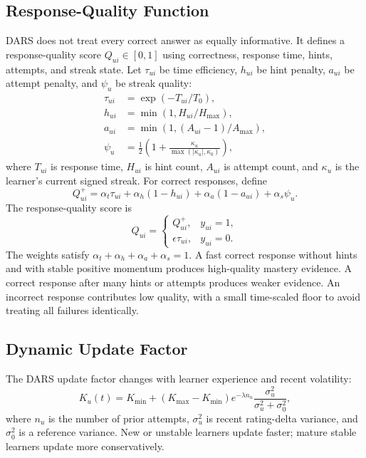 \documentclass[conference]{IEEEtran}
\begin{document}
\subsection{Response-Quality Function}
DARS does not treat every correct answer as equally informative. It defines a response-quality score $Q_{ui}\in[0,1]$ using correctness, response time, hints, attempts, and streak state. Let $\tau_{ui}$ be time efficiency, $h_{ui}$ be hint penalty, $a_{ui}$ be attempt penalty, and $\psi_u$ be streak quality:
\begin{align}
\tau_{ui} &= \exp(-T_{ui}/T_0),\\
h_{ui} &= \min(1,H_{ui}/H_{\max}),\\
a_{ui} &= \min(1,(A_{ui}-1)/A_{\max}),\\
\psi_u &= \frac{1}{2}\left(1+\frac{\kappa_u}{\max(|\kappa_u|,\kappa_0)}\right),
\end{align}
where $T_{ui}$ is response time, $H_{ui}$ is hint count, $A_{ui}$ is attempt count, and $\kappa_u$ is the learner's current signed streak. For correct responses, define
\begin{equation}
Q^+_{ui}=\alpha_t\tau_{ui}+\alpha_h(1-h_{ui})
+\alpha_a(1-a_{ui})+\alpha_s\psi_u.
\end{equation}
The response-quality score is
\begin{equation}
Q_{ui}=
\begin{cases}
Q^+_{ui}, & y_{ui}=1,\\
\epsilon\tau_{ui}, & y_{ui}=0.
\end{cases}
\end{equation}
The weights satisfy $\alpha_t+\alpha_h+\alpha_a+\alpha_s=1$. A fast correct response without hints and with stable positive momentum produces high-quality mastery evidence. A correct response after many hints or attempts produces weaker evidence. An incorrect response contributes low quality, with a small time-scaled floor to avoid treating all failures identically.

\subsection{Dynamic Update Factor}
The DARS update factor changes with learner experience and recent volatility:
\begin{equation}
K_u(t)=K_{\min}+(K_{\max}-K_{\min})e^{-\lambda n_u}
\frac{\sigma_u^2}{\sigma_u^2+\sigma_0^2},
\end{equation}
where $n_u$ is the number of prior attempts, $\sigma_u^2$ is recent rating-delta variance, and $\sigma_0^2$ is a reference variance. New or unstable learners update faster; mature stable learners update more conservatively.
\end{document}
